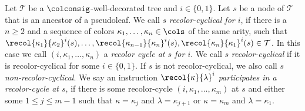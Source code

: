 \begin{definition}\label{def:recolcycl}
	Let $\mathcal{T}$ be a $\colconsig$-well-decorated tree and $i\in\{ 0,1 \}$. Let $s$ be a node of $\mathcal{T}$ that is an ancestor of a pseudoleaf. We call $s$ \emph{recolor-cyclical for $i$}, if there is a $n\ge 2$ and a sequence of colors $\kappa_1, \ldots, \kappa_n\in\cols$ of the same arity, such that $\recol{\kappa_1}{\kappa_2}^{i}(s), \ldots, \recol{\kappa_{n-1}}{\kappa_n}^{i}(s), \recol{\kappa_n}{\kappa_1}^{i}(s)\in\mathcal{T}$. In this case we call $(i, \kappa_1, \ldots, \kappa_n)$ a \emph{recolor cycle at $s$ for $i$}. We call $s$ \emph{recolor-cyclical} if it is recolor-cyclical for some $i\in\{ 0,1 \}$. If $s$ is not recolor-cyclical, we also call $s$ \emph{non-recolor-cyclical}.
	We say an instruction $\recol{\kappa}{\lambda}^{i}$ \emph{participates in a recolor-cycle at $s$}, if there is some recolor-cycle $(i, \kappa_1, \ldots, \kappa_m)$ at $s$ and either some $1\le j \le m-1$ such that $\kappa = \kappa_j$ and $\lambda = \kappa_{j+1}$ or $\kappa = \kappa_m$ and $\lambda = \kappa_1$.
\end{definition}
\allowdisplaybreaks
